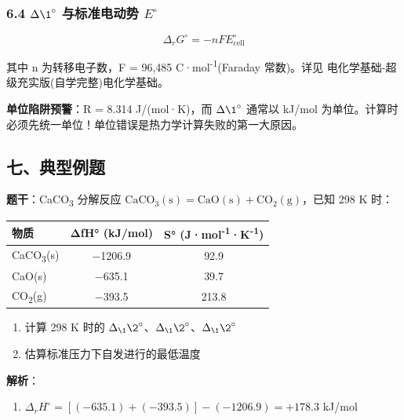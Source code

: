 \subsubsection{\texorpdfstring{6.4 \(\Delta \1^{\circ}\) 与标准电动势 \(E^{\circ}\)}{6.4 \textbackslash Delta \textbackslash1\^{}\{\textbackslash circ\} 与标准电动势 E\^{}\{\textbackslash circ\}}}\label{delta-1circ-ux4e0eux6807ux51c6ux7535ux52a8ux52bf-ecirc}

\[
\Delta_r G^\circ = -nFE^\circ_{\text{cell}}
\]

其中 n 为转移电子数，F = 96,485 C·mol\textsuperscript{-1}(Faraday 常数)。详见 电化学基础-超级充实版(自学完整)\textbar 电化学基础。

\textbf{单位陷阱预警}：R = 8.314 J/(mol·K)，而 \(\Delta \1^{\circ}\) 通常以 kJ/mol 为单位。计算时必须先统一单位！单位错误是热力学计算失败的第一大原因。

\subsection{七、典型例题}\label{ux4e03ux5178ux578bux4f8bux9898}

\textbf{题干}：CaCO\textsubscript{3} 分解反应 \(\mathrm{CaCO_3(s) = CaO(s) + CO_2(g)}\)，已知 298 K 时：

{\def\LTcaptype{none} %
\begin{longtable}[]{@{}lcc@{}}
\toprule\noalign{}
物质 & ΔfH° (kJ/mol) & S° (J·mol\textsuperscript{-1}·K\textsuperscript{-1}) \\
\midrule\noalign{}
\endhead
\bottomrule\noalign{}
\endlastfoot
CaCO\textsubscript{3}(s) & −1206.9 & 92.9 \\
CaO(s) & −635.1 & 39.7 \\
CO\textsubscript{2}(g) & −393.5 & 213.8 \\
\end{longtable}
}

\begin{enumerate}
\def\labelenumi{(\arabic{enumi})}
\tightlist
\item
  计算 298 K 时的 \(\Delta_{\1} \2^{\circ}\)、\(\Delta_{\1} \2^{\circ}\)、\(\Delta_{\1} \2^{\circ}\)
\item
  估算标准压力下自发进行的最低温度
\end{enumerate}

\textbf{解析}：

\begin{enumerate}
\def\labelenumi{(\arabic{enumi})}
\tightlist
\item
  \(\Delta_r H^\circ = [(-635.1) + (-393.5)] - (-1206.9) = +178.3\) kJ/mol
\end{enumerate}

